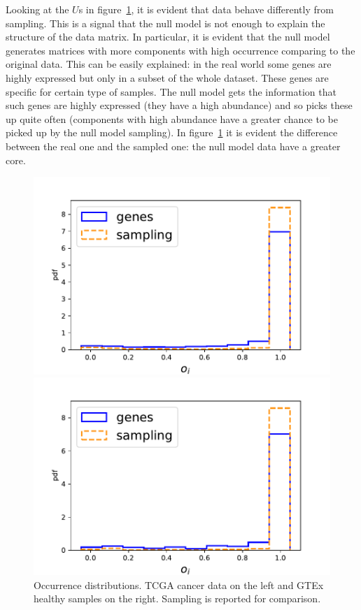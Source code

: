 Looking at the $U$s in figure~\ref{fig:structure/globalU_null}, it is evident that data behave differently from sampling. This is a signal that the null model is not enough to explain the structure of the data matrix. In particular, it is evident that the null model generates matrices with more components with high occurrence comparing to the original data. This can be easily explained: in the real world some genes are highly expressed but only in a subset of the whole dataset. These genes are specific for certain type of samples. The null model gets the information that such genes are highly expressed (they have a high abundance) and so picks these up quite often (components with high abundance have a greater chance to be picked up by the null model sampling). In figure~\ref{fig:structure/globalU_null} it is evident the difference between the real one and the sampled one: the null model data have a greater core.
\begin{figure}[htb!]
\begin{minipage}{0.5\textwidth}
    \centering
    \includegraphics[width=0.95\linewidth]{pictures/structure/tcga/globalU_null.pdf}
\end{minipage}
\hspace{2mm}
\begin{minipage}{0.5\textwidth}
    \centering
    \includegraphics[width=0.95\linewidth]{pictures/structure/gtex/globalU_null.pdf}
    \end{minipage}
\caption{Occurrence distributions. TCGA cancer data on the left and GTEx healthy samples on the right. Sampling is reported for comparison.}
\label{fig:structure/globalU_null}
\end{figure}


